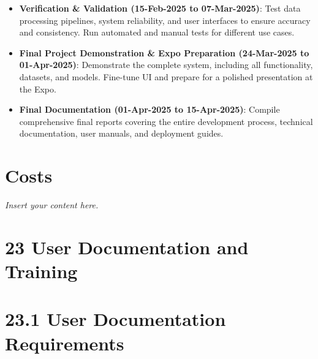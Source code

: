 \documentclass[12pt]{article}
\newcommand{\lips}{\textit{Insert your content here.}}
\begin{document}
\begin{itemize}[leftmargin=2cm]
    \item \textbf{Verification \& Validation (15-Feb-2025 to 07-Mar-2025)}: Test data processing pipelines, system reliability, and user interfaces to ensure accuracy and consistency. Run automated and manual tests for different use cases.
    \item \textbf{Final Project Demonstration \& Expo Preparation (24-Mar-2025 to 01-Apr-2025)}: Demonstrate the complete system, including all functionality, datasets, and models. Fine-tune UI and prepare for a polished presentation at the Expo.
    \item \textbf{Final Documentation (01-Apr-2025 to 15-Apr-2025)}: Compile comprehensive final reports covering the entire development process, technical documentation, user manuals, and deployment guides.
\end{itemize}


\section{Costs}
\lips

\section*{23 User Documentation and Training}

\section*{23.1 User Documentation Requirements}
\end{document}
